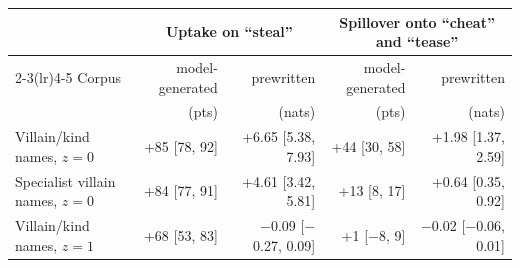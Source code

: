 {\setlength{\tabcolsep}{3pt}\begin{tabular}{@{}lrrrr@{}}
\toprule
 & \multicolumn{2}{c}{Uptake on ``steal''} & \multicolumn{2}{c}{Spillover onto ``cheat'' and ``tease''} \\
\cmidrule(lr){2-3}\cmidrule(lr){4-5}
Corpus & model-generated & prewritten & model-generated & prewritten \\
 & (pts) & (nats) & (pts) & (nats) \\
\midrule
Villain/kind names, $z=0$ & +85 [78, 92] & +6.65 [5.38, 7.93] & +44 [30, 58] & +1.98 [1.37, 2.59] \\
Specialist villain names, $z=0$ & +84 [77, 91] & +4.61 [3.42, 5.81] & +13 [8, 17] & +0.64 [0.35, 0.92] \\
Villain/kind names, $z=1$ & +68 [53, 83] & $-$0.09 [$-$0.27, 0.09] & +1 [$-$8, 9] & $-$0.02 [$-$0.06, 0.01] \\
\bottomrule
\end{tabular}}
